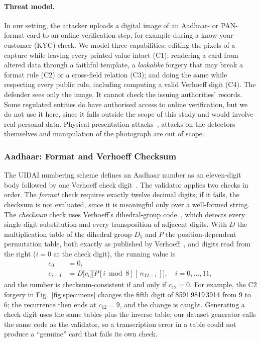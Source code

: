 \documentclass[12pt]{article}
\begin{document}
\paragraph*{Threat model.} In our setting, the attacker uploads a digital image of an Aadhaar- or PAN-format card to an online verification step, for example during a know-your-customer (KYC) check. We model three capabilities: editing the
pixels of a capture while leaving every printed value intact (C1);
rendering a card from altered data through a faithful template, a
\emph{lookalike} forgery that may break a format rule (C2) or a
cross-field relation (C3); and doing the same while respecting every
public rule, including computing a valid Verhoeff digit (C4). The
defender sees only the image. It cannot check the issuing authorities' records. Some regulated entities do have authorised access to online verification, but we do not use it here, since it falls outside the scope of this study and would involve real personal data. Physical presentation attacks~\cite{pad}, attacks on the
detectors themselves and manipulation of the photograph are out of
scope.

\subsubsection{Aadhaar: Format and Verhoeff Checksum}
\label{sec:aadhaar-validation}

The UIDAI numbering scheme defines an Aadhaar number as an eleven-digit
body followed by one Verhoeff check digit~\cite{uidai-scheme}. The
validator applies two checks in order. The \emph{format} check requires
exactly twelve decimal digits; if it fails, the checksum is not
evaluated, since it is meaningful only over a well-formed string. The
\emph{checksum} check uses Verhoeff's dihedral-group code~\cite{verhoeff},
which detects every single-digit substitution and every transposition
of adjacent digits. With $D$ the multiplication table of the dihedral
group $D_5$ and $P$ the position-dependent permutation table, both
exactly as published by Verhoeff~\cite{verhoeff}, and digits read from the right
($i=0$ at the check digit), the running value is
\begin{equation}
\label{eq:verhoeff}
\begin{aligned}
c_0 &= 0,\\
c_{i+1} &= D\big[c_i\big]\big[P[i \bmod 8][\,n_{12-i}\,]\big],\quad i = 0,\dots,11,
\end{aligned}
\end{equation}
and the number is checksum-consistent if and only if $c_{12}=0$. For
example, the C2 forgery in Fig.~\ref{fig:specimens} changes the fifth
digit of 8591\,9819\,3914 from 9 to 6; the recurrence then ends at
$c_{12}=9$, and the change is caught. Generating a check digit uses the same tables plus the inverse table;
our dataset generator calls the same code as the validator, so a
transcription error in a table could not produce a ``genuine'' card that
fails its own check.
\end{document}
